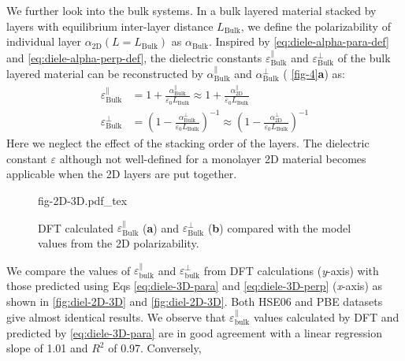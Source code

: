 We further look into the bulk systems. In a bulk layered material stacked by layers with equilibrium
inter-layer distance $L_{\mathrm{Bulk}}$, we define the polarizability
of individual layer $\alpha_{\mathrm{2D}}(L=L_{\mathrm{Bulk}})$ as
$\alpha_{\mathrm{Bulk}}$. Inspired by  \autoref{eq:diele-alpha-para-def} and
\autoref{eq:diele-alpha-perp-def}, the dielectric constants
$\varepsilon^{\parallel}_{\mathrm{Bulk}}$ and
$\varepsilon^{\perp}_{\mathrm{Bulk}}$ of the bulk layered material can
be reconstructed by $\alpha_{\mathrm{Bulk}}^{\parallel}$ and
$\alpha_{\mathrm{Bulk}}^{\perp}$ ( \autoref{fig-4}{\textbf a}) as:
%
%
\begin{subequations}
\begin{align}
  \label{eq:diele-3D-para}
  \varepsilon^{\parallel}_{\mathrm{Bulk}}
  &= 1 + \frac{\alpha_{\mathrm{Bulk}}^{\parallel}}{\varepsilon_{0} L_{\mathrm{Bulk}}}
  \approx 1 + \frac{\alpha_{\mathrm{2D}}^{\parallel}}{\varepsilon_{0} L_{\mathrm{Bulk}}} \\
  \label{eq:diele-3D-perp}
  \varepsilon^{\perp}_{\mathrm{Bulk}}
  &= \left(1 - \frac{\alpha_{\mathrm{Bulk}}^{\perp}}{\varepsilon_{0} L_{\mathrm{Bulk}}}\right)^{-1}
  \approx \left(1 - \frac{\alpha_{\mathrm{2D}}^{\perp}}{\varepsilon_{0} L_{\mathrm{Bulk}}}\right)^{-1}
\end{align}
\end{subequations}
%
%
Here we neglect the effect of the stacking order of the layers.  The
dielectric constant $\varepsilon$ although not well-defined for a
monolayer 2D material becomes applicable when the 2D layers are put
together.
\begin{figure}[!htbp]
\centering
{fig-2D-3D.pdf_tex}
\caption{\label{fig:diel-2D-3D} %
  DFT calculated $\varepsilon_{\mathrm{Bulk}}^{\parallel}$
  (\textbf{a}) and $\varepsilon_{\mathrm{Bulk}}^{\perp}$ (\textbf{b})
  compared with the model values from the 2D polarizability.  }
\end{figure}
%
We compare the values of
$\varepsilon_{\mathrm{bulk}}^{\parallel}$ and
$\varepsilon_{\mathrm{bulk}}^{\perp}$ from DFT calculations (\textit{y}-axis)
with those predicted using Eqs \autoref{eq:diele-3D-para} and \autoref{eq:diele-3D-perp}
(\textit{x}-axis) as shown in  \autoref{fig:diel-2D-3D} and \autoref{fig:diel-2D-3D}. 
Both HSE06 and PBE datasets give almost identical results.  
%
We observe that
$\varepsilon_{\mathrm{bulk}}^{\parallel}$ values calculated by DFT and
predicted by  \autoref{eq:diele-3D-para} are in good agreement with a linear
regression slope of 1.01 and $R^2$ of 0.97. Conversely,
